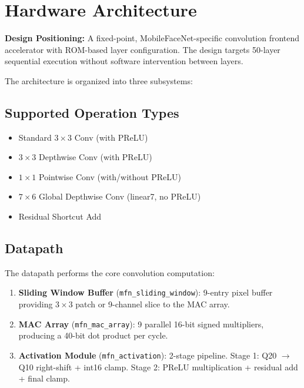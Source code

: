 \section{Hardware Architecture}
 
\textbf{Design Positioning:} A fixed-point, MobileFaceNet-specific convolution frontend accelerator with ROM-based layer configuration. The design targets 50-layer sequential execution without software intervention between layers.
 
The architecture is organized into three subsystems:
 
\subsection{Supported Operation Types}
 
\begin{itemize}[nosep]
  \item Standard $3\times3$ Conv (with PReLU)
  \item $3\times3$ Depthwise Conv (with PReLU)
  \item $1\times1$ Pointwise Conv (with/without PReLU)
  \item $7\times6$ Global Depthwise Conv (linear7, no PReLU)
  \item Residual Shortcut Add
\end{itemize}
 
\subsection{Datapath}
 
The datapath performs the core convolution computation:
 
\begin{enumerate}[nosep]
  \item \textbf{Sliding Window Buffer} (\texttt{mfn\_sliding\_window}): 9-entry pixel buffer providing $3\times3$ patch or 9-channel slice to the MAC array.
  \item \textbf{MAC Array} (\texttt{mfn\_mac\_array}): 9 parallel 16-bit signed multipliers, producing a 40-bit dot product per cycle.
  \item \textbf{Activation Module} (\texttt{mfn\_activation}): 2-stage pipeline.
        Stage 1: Q20 $\rightarrow$ Q10 right-shift + int16 clamp.
        Stage 2: PReLU multiplication + residual add + final clamp.
\end{enumerate}
 
